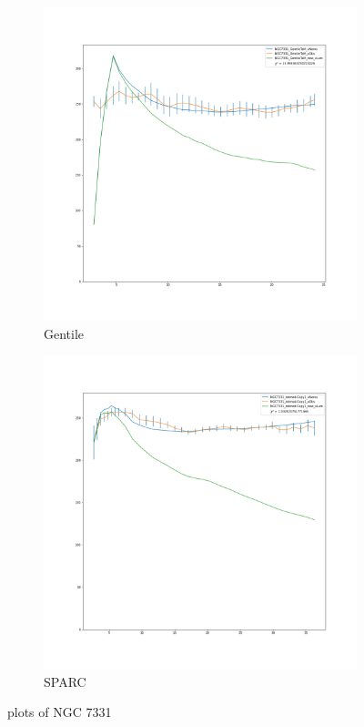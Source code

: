 \documentclass[reprint,%
 amsmath,amssymb,
 aps,
]{revtex4-1}
\begin{document}
%
%
%
\clearpage
 \begin{figure}[h]
\begin{subfigure}{.5\textwidth}
  \centering
  \includegraphics[width=.8\linewidth]{NGC7331_GentileTaM_XueSofue.png}
  \caption{Gentile\cite{Gent}}
  \label{fig:sfig21}
\end{subfigure}%
\begin{subfigure}{.5\textwidth}
  \centering
  \includegraphics[width=.8\linewidth]{NGC7331_rotmod-Copy1_XueSofue.png}
  \caption{SPARC\cite{2016Lelli}}
  \label{fig:sfig22}
\end{subfigure}
\caption{plots of NGC 7331}
\label{fig:fig7331}
\end{figure}
\end{document}
